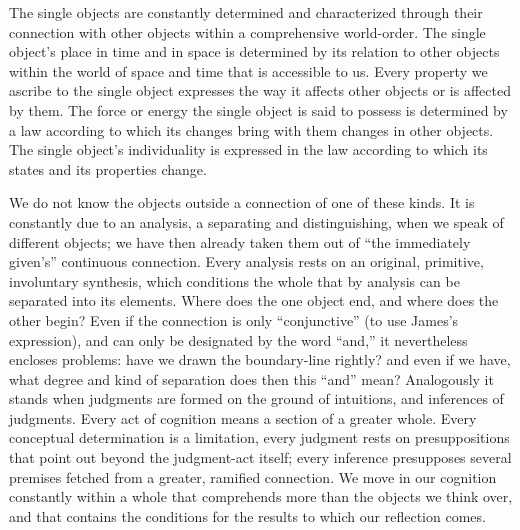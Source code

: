 \documentclass[12pt,a4paper]{book}
\newcommand{\opage}[1]{\marginnote{\footnotesize\textit{[#1]}}}
\begin{document}
The single objects are constantly determined and characterized through their connection with other
objects within a comprehensive world-order. The single object's place in time and in space is
determined by its relation to other objects within the world of space and time that is accessible to
us. Every property we ascribe to the single object expresses the way it affects other objects or is
affected by them. The force or energy the single object is said to possess is determined by a law
according to which its changes bring with them changes in other objects. The single object's
individuality is expressed in the law according to which its states and its properties change.

\opage{325}We do not know the objects outside a connection of one of these kinds. It is constantly due to an
analysis, a separating and distinguishing, when we speak of different objects; we have then already
taken them out of ``the immediately given's'' continuous connection. Every analysis rests on an
original, primitive, involuntary synthesis, which conditions the whole that by analysis can be
separated into its elements. Where does the one object end, and where does the other begin? Even if
the connection is only ``conjunctive'' (to use James's expression), and can only be designated by the
word ``and,'' it nevertheless encloses problems: have we drawn the boundary-line rightly? and even if
we have, what degree and kind of separation does then this ``and'' mean? Analogously it stands when
judgments are formed on the ground of intuitions, and inferences of judgments. Every act of cognition
means a section of a greater whole. Every conceptual determination is a limitation, every judgment
rests on presuppositions that point out beyond the judgment-act itself; every inference presupposes
several premises fetched from a greater, ramified connection. We move in our cognition constantly
within a whole that comprehends more than the objects we think over, and that contains the conditions
for the results to which our reflection comes.
\end{document}
